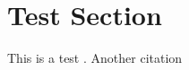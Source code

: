 \begin{comment}
							

\end{comment}

\section{Test Section}
This is a test \cite{2_kohl_2012}. Another citation \cite{Ferragina}

\newpage